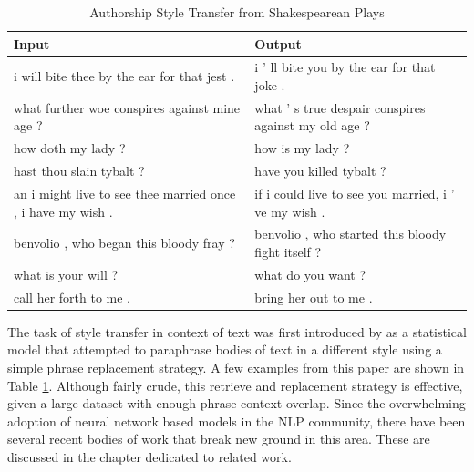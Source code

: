 \begin{table}[ht]
	\centering
	\begin{tabular}{ | p{.45\linewidth} | p{.45\linewidth} | }
		\hline
		\textbf{Input}                                              & \textbf{Output}                                      \\
		\hline \hline
		i will bite thee by the ear for that jest .                 & i ’ ll bite you by the ear for that joke .           \\
		\hline
		what further woe conspires against mine age ?               & what ’ s true despair conspires against my old age ? \\
		\hline
		how doth my lady ?                                          & how is my lady ?                                     \\
		\hline
		hast thou slain tybalt ?                                    & have you killed tybalt ?                             \\
		\hline
		an i might live to see thee married once , i have my wish . & if i could live to see you married, i ’ ve my wish . \\
		\hline
		benvolio , who began this bloody fray ?                     & benvolio , who started this bloody fight itself ?    \\
		\hline
		what is your will ?                                         & what do you want ?                                   \\
		\hline
		call her forth to me .                                      & bring her out to me .                                \\
		\hline
	\end{tabular}
	\caption{Authorship Style Transfer from Shakespearean Plays}
	\label{tab:paraphrasing-for-style-results}
\end{table}

The task of style transfer in context of text was first introduced by \cite{xu2012paraphrasing} as a statistical model that attempted to paraphrase bodies of text in a different style using a simple phrase replacement strategy. A few examples from this paper are shown in Table \ref{tab:paraphrasing-for-style-results}. Although fairly crude, this retrieve and replacement strategy is effective, given a large dataset with enough phrase context overlap. Since the overwhelming adoption of neural network based models in the NLP community, there have been several recent bodies of work that break new ground in this area. These are discussed in the chapter dedicated to related work.


